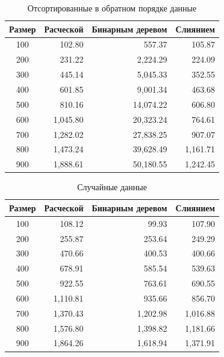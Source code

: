 \begin{table}[h]
	\begin{center}
		\begin{threeparttable}
		\captionsetup{singlelinecheck=off}
		\caption{Отсортированные в обратном порядке данные}
		\label{tbl:worth}
		\begin{tabular}{|c|r|r|r|}
			\hline
			 Размер & Расческой & Бинарным деревом & Слиянием \\
			\hline
			  100 & 102.80 & 557.37 & 105.87 \\ 
			\hline
			200 & 231.22 & 2,224.29 & 224.09 \\ 
			\hline
			300 & 445.14 & 5,045.33 & 352.55 \\ 
			\hline
			400 & 601.85 & 9,001.34 & 463.68 \\ 
			\hline
			500 & 810.16 & 14,074.22 & 606.80 \\ 
			\hline
			600 & 1,045.80 & 20,323.24 & 764.61 \\ 
			\hline
			700 & 1,282.02 & 27,838.25 & 907.07 \\ 
			\hline
			800 & 1,473.24 & 39,628.49 & 1,161.71 \\ 
			\hline
			900 & 1,888.61 & 50,180.55 & 1,242.45 \\ 
			\hline
		\end{tabular}
		\end{threeparttable}
    \end{center}
\end{table}

\begin{table}[h]
	\begin{center}
		\begin{threeparttable}
		\captionsetup{singlelinecheck=off}
		\caption{Случайные данные}
		\label{tbl:random}
		\begin{tabular}{|c|r|r|r|}
			\hline
			 Размер & Расческой & Бинарным деревом & Слиянием \\
			\hline
			  100 & 108.12 & 99.93 & 107.90 \\ 
			\hline
			200 & 255.87 & 253.64 & 249.29 \\ 
			\hline
			300 & 470.66 & 400.53 & 400.66 \\ 
			\hline
			400 & 678.91 & 585.54 & 539.63 \\ 
			\hline
			500 & 922.55 & 763.61 & 690.55 \\ 
			\hline
			600 & 1,110.81 & 935.66 & 856.70 \\ 
			\hline
			700 & 1,370.43 & 1,202.98 & 1,016.88 \\ 
			\hline
			800 & 1,576.80 & 1,398.82 & 1,181.66 \\ 
			\hline
			900 & 1,864.26 & 1,618.94 & 1,371.91 \\ 
			\hline
		\end{tabular}
		\end{threeparttable}
    \end{center}
\end{table}

